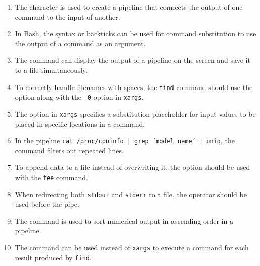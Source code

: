 \documentclass[a4paper]{report}
\begin{document}
\begin{enumerate}[1.]
    \item The \underline{\hspace{2cm}} character is used to create a pipeline that connects the output of one command to the input of another.
    
    \item In Bash, the \underline{\hspace{2cm}} syntax or backticks can be used for command substitution to use the output of a command as an argument.
    
    \item The \underline{\hspace{2cm}} command can display the output of a pipeline on the screen and save it to a file simultaneously.
    
    \item To correctly handle filenames with spaces, the \texttt{find} command should use the \underline{\hspace{2cm}} option along with the \texttt{-0} option in \texttt{xargs}.
    
    \item The \underline{\hspace{2cm}} option in \texttt{xargs} specifies a substitution placeholder for input values to be placed in specific locations in a command.
    
    \item In the pipeline \texttt{cat /proc/cpuinfo | grep 'model name' | uniq}, the \underline{\hspace{2cm}} command filters out repeated lines.
    
    \item To append data to a file instead of overwriting it, the \underline{\hspace{2cm}} option should be used with the \texttt{tee} command.
    
    \item When redirecting both \texttt{stdout} and \texttt{stderr} to a file, the \underline{\hspace{2cm}} operator should be used before the pipe.
    
    \item The \underline{\hspace{2cm}} command is used to sort numerical output in ascending order in a pipeline.
    
    \item The \underline{\hspace{2cm}} command can be used instead of \texttt{xargs} to execute a command for each result produced by \texttt{find}.
    \end{enumerate}
\end{document}

